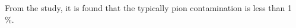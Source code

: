 \begin{comment}
\begin{figure}[ht]
\centering
\subfigure[Pion contamination]{
\texttt{[image: FigBkGrnd/GlbFitLinThEbBoth\_E4ppt.eps]} 
\label{figpcFit3}
}
\subfigure[Pair-symmetric contamination]{
\texttt{[image: FigBkGrnd/psContVsP\_alFits3ppt.eps]}
\label{figpscFit}
}
\label{figpcFits} %
\caption[Fits of pion contamination]{Fits of pion contamination.}
\end{figure}
\end{comment}


From the study, it is found that the typically pion contamination is less than 1 \%.
